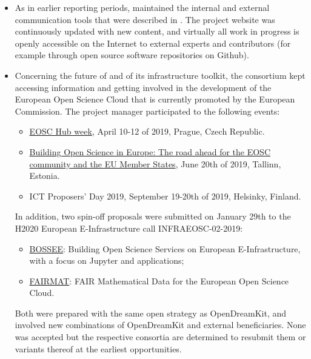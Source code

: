 \begin{itemize}
\item As in earlier reporting periods,  maintained the
  internal and external communication tools that were described in
  . The project website was
  continuously updated with new content, and virtually all work in
  progress is openly accessible on the Internet to external experts
  and contributors (for example through open source software
  repositories on Github).

\item Concerning the future of \ODK and of its infrastructure toolkit,
  the consortium kept accessing information and getting involved in
  the development of the European Open Science Cloud that is currently
  promoted by the European Commission. The project manager
  participated to the following events:
  \begin{itemize}
  \item \href{https://www.eosc-hub.eu/events/eosc-hub-week-2019}{EOSC
      Hub week}, April 10-12 of 2019, Prague, Czech Republic.
  \item
    \href{https://www.eosc-hub.eu/events/building-open-science-europe-road-ahead-eosc-community}{Building
      Open Science in Europe: The road ahead for the EOSC community
      and the EU Member States}, June 20th of 2019, Tallinn, Estonia.
  \item ICT Proposers' Day 2019, September 19-20th of 2019, Helsinky, Finland.
  \end{itemize}

  \noindent
  In addition, two spin-off proposals were submitted on January 29th
  to the H2020 European E-Infrastructure call INFRAEOSC-02-2019:
  \begin{itemize}
  \item \href{https://github.com/bossee-project/proposal}{BOSSEE}:
    Building Open Science Services on European E-Infrastructure, with
    a focus on Jupyter and applications;
  \item \href{https://opendreamkit.org/2019/01/29/FAIRmat/}{FAIRMAT}:
    FAIR Mathematical Data for the European Open Science Cloud.
  \end{itemize}
  Both were prepared with the same open strategy as OpenDreamKit, and
  involved new combinations of OpenDreamKit and external
  beneficiaries. None was accepted but the respective consortia are
  determined to resubmit them or variants thereof at the earliest
  opportunities.



\end{itemize}

